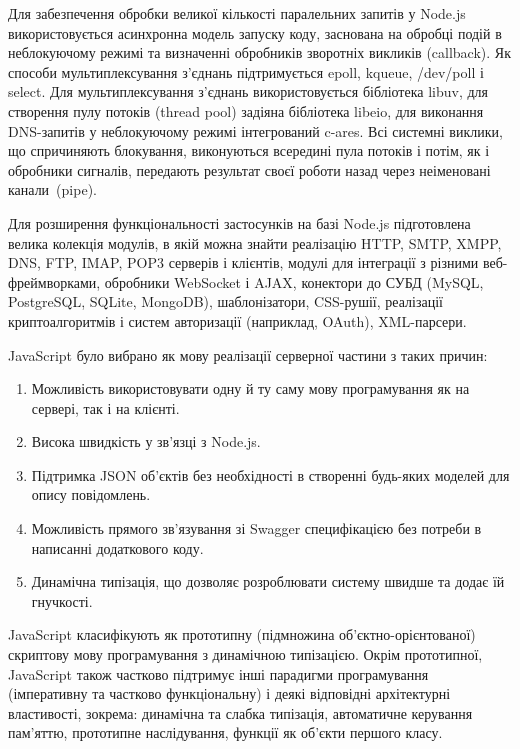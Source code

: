 \documentclass[../main.tex]{subfiles}
\begin{document}
Для забезпечення обробки великої кількості паралельних запитів у Node.js використовується асинхронна модель запуску коду, заснована на обробці подій в неблокуючому режимі та визначенні обробників зворотніх викликів (callback). Як способи мультиплексування з'єднань підтримується epoll, kqueue, /dev/poll і select. Для мультиплексування з'єднань використовується бібліотека libuv, для створення пулу потоків (thread pool) задіяна бібліотека libeio, для виконання DNS-запитів у неблокуючому режимі інтегрований c-ares. Всі системні виклики, що спричиняють блокування, виконуються всередині пула потоків і потім, як і обробники сигналів, передають результат своєї роботи назад через неіменовані канали~(pipe). %

Для розширення функціональності застосунків на базі Node.js підготовлена велика колекція модулів, в якій можна знайти реалізацію HTTP, SMTP, XMPP, DNS, FTP, IMAP, POP3 серверів і клієнтів, модулі для інтеграції з різними веб-фреймворками, обробники WebSocket і AJAX, конектори до СУБД (MySQL, PostgreSQL, SQLite, MongoDB), шаблонізатори, CSS-рушії, реалізації криптоалгоритмів і систем авторизації (наприклад, OAuth), XML-парсери.

JavaScript було вибрано як мову реалізації серверної частини з таких причин:
\begin{enumerate}
	\item Можливість використовувати одну й ту саму мову програмування як на сервері, так і на клієнті.
	\item Висока швидкість у зв'язці з Node.js.
	\item Підтримка JSON об'єктів без необхідності в створенні будь-яких моделей для опису повідомлень.
	\item Можливість прямого зв'язування зі Swagger специфікацією без потреби в написанні додаткового коду.
	\item Динамічна типізація, що дозволяє розроблювати систему швидше та додає їй гнучкості.
\end{enumerate}

JavaScript класифікують як прототипну (підмножина об'єктно-\linebreak[0]орієнтованої) скриптову мову програмування з динамічною типізацією. Окрім прототипної, JavaScript також частково підтримує інші парадигми програмування (імперативну та частково функціональну) і деякі відповідні архітектурні властивості, зокрема: динамічна та слабка типізація, автоматичне керування пам'яттю, прототипне наслідування, функції як об'єкти першого класу.
\end{document}
